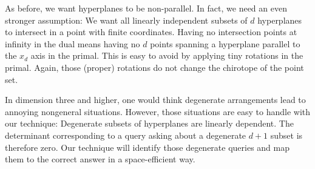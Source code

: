 As before, we want hyperplanes to be non-parallel. In fact, we need an even
stronger assumption: We want all linearly independent subsets of \(d\)
hyperplanes to intersect in a point with finite coordinates.
%
Having no intersection points at infinity in the dual
means having no \(d\) points spanning a hyperplane parallel to the
\(x_d\) axis in the primal. This is easy to avoid by applying tiny rotations
in the primal. Again, those (proper) rotations do not change the chirotope of the
point set.

In dimension three and higher, one would think degenerate arrangements lead to
annoying nongeneral situations. However, those situations are easy to handle
with our technique: Degenerate subsets of hyperplanes are linearly dependent.
The determinant corresponding to a query asking about a
degenerate \(d+1\) subset is therefore zero. Our technique will identify those
degenerate queries and map them to the correct answer in a space-efficient way.


